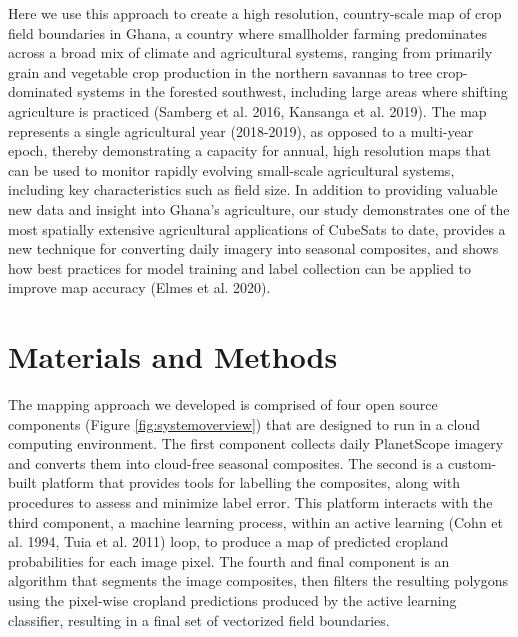 \documentclass[11pt,a4paper]{article}
\begin{document}
Here we use this approach to create a high resolution, country-scale map
of crop field boundaries in Ghana, a country where smallholder farming
predominates across a broad mix of climate and agricultural systems,
ranging from primarily grain and vegetable crop production in the
northern savannas to tree crop-dominated systems in the forested
southwest, including large areas where shifting agriculture is practiced
(Samberg et al. 2016, Kansanga et al. 2019). The map represents a single
agricultural year (2018-2019), as opposed to a multi-year epoch, thereby
demonstrating a capacity for annual, high resolution maps that can be
used to monitor rapidly evolving small-scale agricultural systems,
including key characteristics such as field size. In addition to
providing valuable new data and insight into Ghana's agriculture, our
study demonstrates one of the most spatially extensive agricultural
applications of CubeSats to date, provides a new technique for
converting daily imagery into seasonal composites, and shows how best
practices for model training and label collection can be applied to
improve map accuracy (Elmes et al. 2020).

\hypertarget{materials-and-methods}{%
\section{Materials and Methods}\label{materials-and-methods}}

The mapping approach we developed is comprised of four open source
components (Figure \ref{fig:systemoverview}) that are designed to run in
a cloud computing environment. The first component collects daily
PlanetScope imagery and converts them into cloud-free seasonal
composites. The second is a custom-built platform that provides tools
for labelling the composites, along with procedures to assess and
minimize label error. This platform interacts with the third component,
a machine learning process, within an active learning (Cohn et al. 1994,
Tuia et al. 2011) loop, to produce a map of predicted cropland
probabilities for each image pixel. The fourth and final component is an
algorithm that segments the image composites, then filters the resulting
polygons using the pixel-wise cropland predictions produced by the
active learning classifier, resulting in a final set of vectorized field
boundaries.
\end{document}
